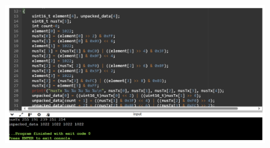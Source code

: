 \documentclass{Configuration_Files/PoliMi3i_thesis}
\begin{document}
\begin{figure}[H]
    \centering
    \includegraphics[scale=0.7]{Shift Algorithm/Screenshot 2024-07-22 at 22.32.05.png}
    \label{fig:pairing_procedure}
\end{figure}
\end{document}
